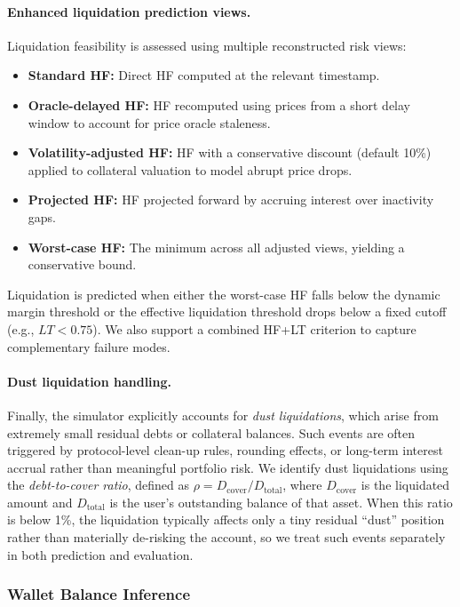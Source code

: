 \documentclass[manuscript,screen,review]{acmart}
\begin{document}
\paragraph{Enhanced liquidation prediction views.}
Liquidation feasibility is assessed using multiple reconstructed risk views:
\begin{itemize}
    \item \textbf{Standard HF:} Direct HF computed at the relevant timestamp.
    \item \textbf{Oracle-delayed HF:} HF recomputed using prices from a short delay window to account for price oracle staleness.
    \item \textbf{Volatility-adjusted HF:} HF with a conservative discount (default 10\%) applied to collateral valuation to model abrupt price drops.
    \item \textbf{Projected HF:} HF projected forward by accruing interest over inactivity gaps.
    \item \textbf{Worst-case HF:} The minimum across all adjusted views, yielding a conservative bound.
\end{itemize}
Liquidation is predicted when either the worst-case HF falls below the dynamic margin threshold or the effective liquidation threshold drops below a fixed cutoff (e.g., $LT < 0.75$). We also support a combined HF+LT criterion to capture complementary failure modes.

\paragraph{Dust liquidation handling.}
Finally, the simulator explicitly accounts for \emph{dust liquidations}, which arise from extremely small residual debts or collateral balances. Such events are often triggered by protocol-level clean-up rules, rounding effects, or long-term interest accrual rather than meaningful portfolio risk. 
We identify dust liquidations using the \emph{debt-to-cover ratio}, defined as $\rho = D_{\text{cover}} / D_{\text{total}}$, where $D_{\text{cover}}$ is the liquidated amount and $D_{\text{total}}$ is the user's outstanding balance of that asset. 
When this ratio is below 1\%, the liquidation typically affects only a tiny residual ``dust'' position rather than materially de-risking the account, so we treat such events separately in both prediction and evaluation.


\subsubsection{Wallet Balance Inference}
\label{sec:wallet_inference}
\end{document}
